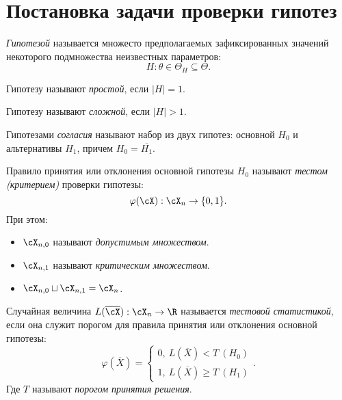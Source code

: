 \section{Постановка задачи проверки гипотез}

\begin{definition}
	\textit{Гипотезой} называется множесто предполагаемых зафиксированных значений
	некоторого подмножества неизвестных параметров:
	\[
		H: \theta \in \Theta_{H} \subseteq \Theta
	.\]
\end{definition}

\begin{definition}
	Гипотезу называют \textit{простой}, если $|H| = 1$.
\end{definition}

\begin{definition}
	Гипотезу называют \textit{сложной}, если $|H| > 1$.
\end{definition}

\begin{definition}
	Гипотезами \textit{согласия} называют набор из двух гипотез: основной $H_0$ и
	альтернативы $H_1$, причем $H_0 = \overline{H_1}$.
\end{definition}

\begin{definition}
	Правило принятия или отклонения основной гипотезы $H_0$ называют
	\textit{тестом (критерием)} проверки гипотезы:
	\[
		\varphi(\cX): \cX_{n} \to \{0, 1\}
	.\]
	При этом:
	\begin{itemize}
		\item $\cX_{n, 0}$ называют \textit{допустимым множеством}.
		\item $\cX_{n, 1}$ называют \textit{критическим множеством}.
		\item $\cX_{n, 0} \sqcup \cX_{n, 1} = \cX_{n}$.
	\end{itemize}
\end{definition}

\begin{definition}
	Случайная величина $L(\overline{\cX}): \cX_n \to \R$ называется
	\textit{тестовой статистикой}, если она служит порогом для правила принятия
	или отклонения основной гипотезы:
	\[
		\varphi(\overline{X}) = \begin{cases}
			0,~ L(\overline{X}) < T \> (H_0) \\
			1,~ L(\overline{X}) \geqslant T \> (H_1)
		\end{cases}
	.\]
	Где $T$ называют \textit{порогом принятия решения}.
\end{definition}
